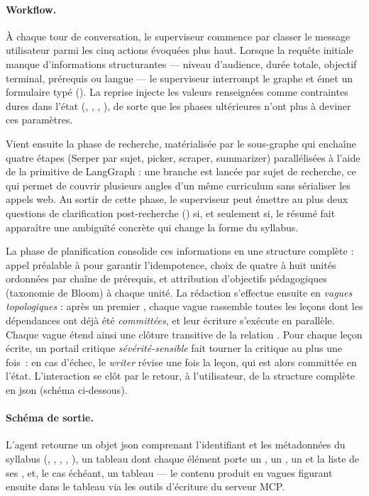 \paragraph{Workflow.}
À chaque tour de conversation, le superviseur commence par classer
le message utilisateur parmi les cinq actions évoquées plus haut.
Lorsque la requête initiale manque d'informations structurantes —
niveau d'audience, durée totale, objectif terminal, prérequis ou
langue — le superviseur interrompt le graphe et émet un formulaire
typé (). La reprise injecte les valeurs renseignées
comme contraintes dures dans l'état (,
, ,
), de sorte que les phases ultérieures n'ont
plus à deviner ces paramètres.

Vient ensuite la phase de recherche, matérialisée par le sous-graphe
 qui enchaîne quatre étapes (Serper par sujet, picker,
scraper, summarizer) parallélisées à l'aide de la primitive
 de LangGraph : une branche est lancée par sujet de
recherche, ce qui permet de couvrir plusieurs angles d'un même
curriculum sans sérialiser les appels web. Au sortir de cette phase,
le superviseur peut émettre au plus deux questions de clarification
post-recherche () si, et seulement si, le résumé fait
apparaître une ambiguïté concrète qui change la forme du syllabus.

La phase de planification consolide ces informations en une
structure complète : appel préalable à 
pour garantir l'idempotence, choix de quatre à huit unités ordonnées
par chaîne de prérequis, et attribution d'objectifs pédagogiques
(taxonomie de Bloom) à chaque unité. La rédaction s'effectue ensuite
en \emph{vagues topologiques} : après un premier ,
chaque vague rassemble toutes les leçons dont les dépendances ont
déjà été \emph{committées}, et leur écriture s'exécute en parallèle.
Chaque vague étend ainsi une clôture transitive de la relation
. Pour chaque leçon écrite, un portail critique
\emph{sévérité-sensible} fait tourner la critique au plus une fois~:
en cas d'échec, le \emph{writer} révise une fois la leçon, qui est
alors committée en l'état. L'interaction se clôt par le retour, à
l'utilisateur, de la structure complète en \gls{json} (schéma
ci-dessous).

\paragraph{Schéma de sortie.} L'agent retourne un objet \gls{json}
comprenant l'identifiant et les métadonnées du syllabus
(, , ,
, ), un tableau
 dont chaque élément porte un , un
, un  et la liste de ses
, et, le cas échéant, un tableau
 — le contenu produit en vagues figurant
ensuite dans le tableau  via les outils
d'écriture du serveur MCP.

